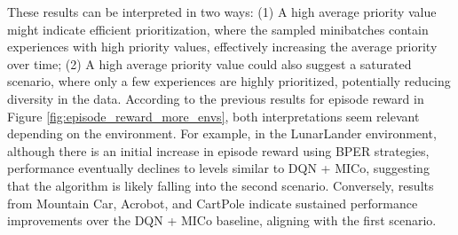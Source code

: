 These results can be interpreted in two ways: (1) A high average priority value might indicate efficient prioritization, where the sampled minibatches contain experiences with high priority values, effectively increasing the average priority over time; (2) A high average priority value could also suggest a saturated scenario, where only a few experiences are highly prioritized, potentially reducing diversity in the data. According to the previous results for episode reward in Figure \ref{fig:episode_reward_more_envs}, both interpretations seem relevant depending on the environment. For example, in the LunarLander environment, although there is an initial increase in episode reward using BPER strategies, performance eventually declines to levels similar to DQN + MICo, suggesting that the algorithm is likely falling into the second scenario. Conversely, results from Mountain Car, Acrobot, and CartPole indicate sustained performance improvements over the DQN + MICo baseline, aligning with the first scenario. 


